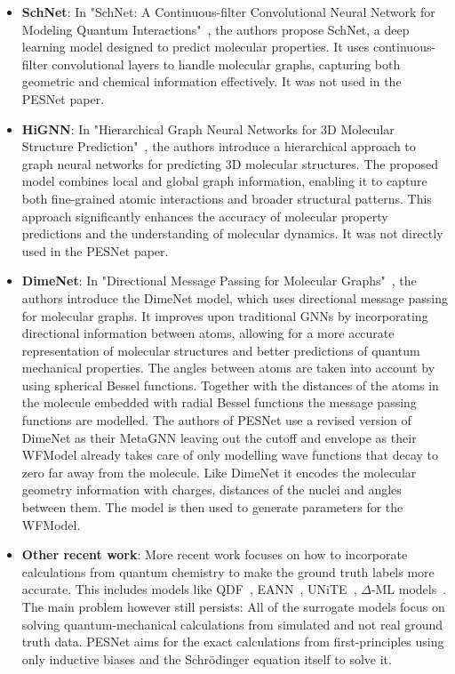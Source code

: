 \documentclass{article}
\begin{document}
\begin{itemize}
    \item \textbf{SchNet}: In "SchNet: A Continuous-filter Convolutional Neural Network for Modeling Quantum Interactions"~\cite{schuttSchNetDeepLearning2018}, the authors propose SchNet, a deep learning model designed to predict molecular properties. It uses continuous-filter convolutional layers to handle molecular graphs, capturing both geometric and chemical information effectively. It was not used in the PESNet paper.
    \item \textbf{HiGNN}: In "Hierarchical Graph Neural Networks for 3D Molecular Structure Prediction"~\citep{yangAnalyzingLearnedMolecular2019}, the authors introduce a hierarchical approach to graph neural networks for predicting 3D molecular structures. The proposed model combines local and global graph information, enabling it to capture both fine-grained atomic interactions and broader structural patterns. This approach significantly enhances the accuracy of molecular property predictions and the understanding of molecular dynamics. It was not directly used in the PESNet paper.
    \item \textbf{DimeNet}: In "Directional Message Passing for Molecular Graphs"~\citep{klicperaDirectionalMessagePassing2019}, the authors introduce the DimeNet model, which uses directional message passing for molecular graphs. It improves upon traditional GNNs by incorporating directional information between atoms, allowing for a more accurate representation of molecular structures and better predictions of quantum mechanical properties. The angles between atoms are taken into account by using spherical Bessel functions. Together with the distances of the atoms in the molecule embedded with radial Bessel functions the message passing functions are modelled. The authors of PESNet use a revised version of DimeNet as their MetaGNN leaving out the cutoff and envelope as their WFModel already takes care of only modelling wave functions that decay to zero far away from the molecule. Like DimeNet it encodes the molecular geometry information with charges, distances of the nuclei and angles between them. The model is then used to generate parameters for the WFModel.
    \item \textbf{Other recent work}: More recent work focuses on how to incorporate calculations from quantum chemistry to make the ground truth labels more accurate. This includes models like QDF~\citep{tsubakiQuantumDeepField2020}, EANN~\citep{zhangEmbeddedAtomNeural2019}, UNiTE~\citep{qiaoUNiTEUnitaryNbody2021}, $\Delta$-ML models~\citep{wengertDataefficientMachineLearning2021}. The main problem however still persists: All of the surrogate models focus on solving quantum-mechanical calculations from simulated and not real ground truth data. PESNet aims for the exact calculations from first-principles using only inductive biases and the Schrödinger equation itself to solve it.
\end{itemize}
\end{document}
